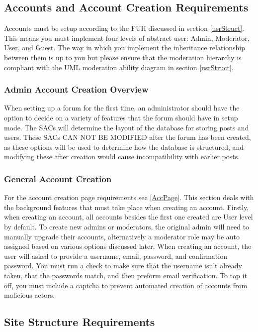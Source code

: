 \documentclass[]{article}
\begin{document}
\subsection{Accounts and Account Creation Requirements}\label{accountCreation}
Accounts must be setup according to the FUH discussed in section \ref{usrStruct}. This means you must implement four levels of abstract user: Admin, Moderator, User, and Guest. The way in which you implement the inheritance relationship between them is up to you but please ensure that the moderation hierarchy is compliant with the UML moderation ability diagram in section \ref{usrStruct}. 

\subsubsection{Admin Account Creation Overview}\label{accAdmin}
When setting up a forum for the first time, an administrator should have the option to decide on a variety of features that the forum should have in setup mode. The SACs will determine the layout of the database for storing posts and users. These SACs CAN NOT BE MODIFIED after the forum has been created, as these options will be used to determine how the database is structured, and modifying these after creation would cause incompatibility with earlier posts.

\subsubsection{General Account Creation}
For the account creation page requirements see \ref{AccPage}. This section deals with the background features that must take place when creating an account. Firstly, when creating an account, all accounts besides the first one created are User level by default. To create new admins or moderators, the original admin will need to manually upgrade their accounts, alternatively a moderator role may be auto assigned based on various options discussed later. When creating an account, the user will asked to provide a username, email, password, and confirmation password. You must run a check to make sure that the username isn't already taken, that the passwords match, and then preform email verification. To top it off, you must include a captcha to prevent automated creation of accounts from malicious actors.

\subsection{Site Structure Requirements}
\end{document}
